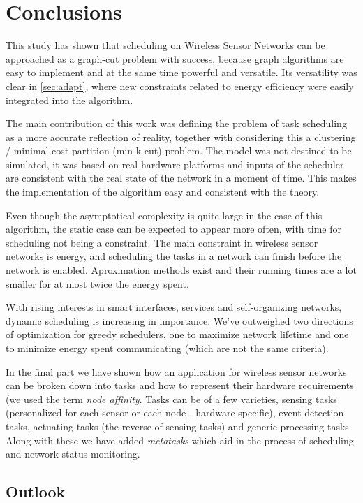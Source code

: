\chapter{Conclusions}

This study has shown that scheduling on Wireless Sensor Networks can be approached as a graph-cut problem with success,
because graph algorithms are easy to implement and at the same time powerful and versatile. Its versatility  was clear 
in \ref{sec:adapt}, where new constraints related to energy efficiency were easily integrated into the algorithm.

The main contribution of this work was defining the problem of task scheduling as a more accurate reflection of reality, 
together with considering this a clustering / minimal cost partition (min k-cut) problem. The model was not destined to 
be simulated, it was based on real hardware platforms and inputs of the scheduler are consistent with the real state of
the network in a moment of time. This makes the implementation of the algorithm easy and consistent with the theory. 

Even though the asymptotical complexity is quite large in the case of this algorithm, the static case can be expected 
to appear more often, with time for scheduling not being a constraint. The main constraint in wireless sensor networks 
is energy, and scheduling the tasks in a network can finish before the network is enabled. Aproximation methods
exist and their running times are a lot smaller for at most twice the energy spent.

With rising interests in smart interfaces, services and self-organizing networks, dynamic scheduling is increasing in 
importance. We've outweighed two directions of optimization for greedy schedulers, one to maximize network lifetime and
one to minimize energy spent communicating (which are not the same criteria). 

In the final part we have shown how an application for wireless sensor networks can be broken down into tasks and how
to represent their hardware requirements (we used the term \textit{node affinity}. Tasks can be of a few varieties,
sensing tasks (personalized for each sensor or each node - hardware specific), event detection tasks, actuating tasks
(the reverse of sensing tasks) and generic processing tasks. Along with these we have added \textit{metatasks} which 
aid in the process of scheduling and network status monitoring.

\section{Outlook}

